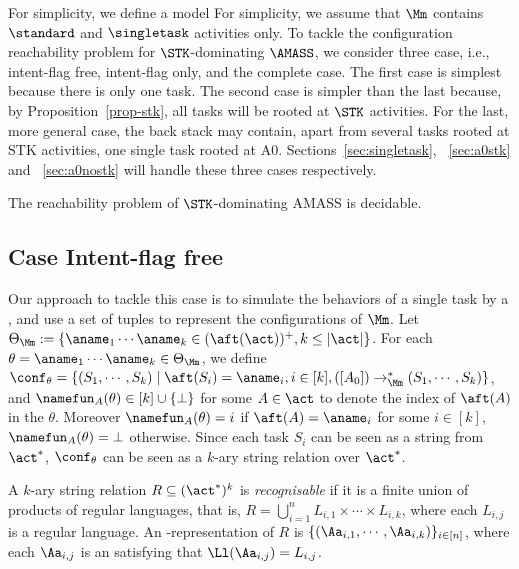 For simplicity, we define a model 
For simplicity, we assume that $\Mm$ contains $\standard$ and $\singletask$ activities only. To tackle the configuration reachability problem for $\STK$-dominating $\AMASS$, we consider three case, i.e., 
intent-flag free, intent-flag only, and the complete case.
The first case is simplest because there is only one task.
The second case is simpler than the last because, by Proposition~\ref{prop-stk}, all tasks will be rooted at $\STK$ activities. For the last, more general case, the back stack may contain, apart from several tasks rooted at STK activities, one single task rooted at A0.
Sections~\ref{sec:singletask}, ~\ref{sec:a0stk} and ~\ref{sec:a0nostk} will handle these three cases respectively.

\begin{theorem}\label{thm-st-amass-reach}
The reachability problem of $\STK$-dominating AMASS is decidable.
\end{theorem}

\subsection{Case Intent-flag free}\label{sec:intent-flag-free}
Our approach to tackle this case is to simulate the behaviors of a single task by a {\PDS}, and use a set of {\NFA} tuples to represent the configurations of {\AMASS} $\Mm$.
Let $\Theta_\Mm:=\{ \aname_1 \cdots \aname_k \in (\aft(\act))^+, k \le |\act|\}$. For each $\theta=\aname_1 \cdots \aname_k \in \Theta_\Mm$, we define $\conf_\theta = \{(S_1, \cdots, S_k) \mid \aft(S_i) =\aname_i, i\in[k],  ([A_0]) \rightarrow_\Mm^* (S_1, \cdots, S_k)\}$, and $\namefun_A(\theta)\in[k]\cup\{\bot\}$ for some $A\in\act$ to denote the index of $\aft(A)$ in the $\theta$. Moreover $\namefun_A(\theta) = i$ if $\aft(A) = \aname_i$ for some $i\in[k]$, $\namefun_A(\theta) = \bot$ otherwise. Since each task $S_i$ can be seen as a string from $\act^*$, $\conf_\theta$ can be seen as a $k$-ary string relation over $\act^*$. 

\begin{definition}
A $k$-ary string relation $R \subseteq (\act^*)^k$ is \emph{recognisable}  if it is a finite union of products of regular languages, that is, $R=\bigcup \limits_{i =1 }^n L_{i,1} \times \cdots \times L_{i, k}$, where each $L_{i,j}$ is a regular language. An {\NFA}-representation of $R$ is $\{(\Aa_{i,1},\cdots,\Aa_{i,k})\}_{i\in[n]}$, where each $\Aa_{i,j}$ is an {\NFA} satisfying that $\Ll(\Aa_{i,j}) = L_{i,j}$.
\end{definition}

